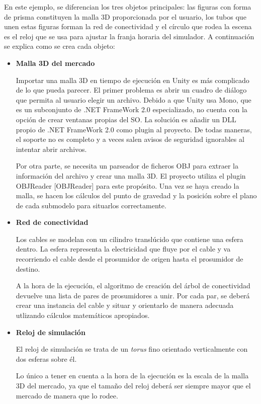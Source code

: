 \documentclass[12pt,a4paper,openright,oneside]{article}
\numberwithin{equation}{section}
\theoremstyle{definition}
\begin{document}
En este ejemplo, se diferencian los tres objetos principales: las figuras con forma de prisma constituyen la malla 3D proporcionada por el usuario, los tubos que unen estas figuras forman la red de conectividad y el círculo que rodea la escena es el reloj que se usa para ajustar la franja horaria del simulador. A continuación se explica como se crea cada objeto:
\begin{itemize}
\item \textbf{Malla 3D del mercado}

Importar una malla 3D en tiempo de ejecución en Unity es más complicado de lo que pueda parecer. El primer problema es abrir un cuadro de diálogo que permita al usuario elegir un archivo. Debido a que Unity usa Mono, que es un subconjunto de .NET FrameWork 2.0 especializado, no cuenta con la opción de crear ventanas propias del SO. La solución es añadir un DLL propio de .NET FrameWork 2.0 como plugin al proyecto. De todas maneras, el soporte no es completo y a veces salen avisos de seguridad ignorables al intentar abrir archivos.

Por otra parte, se necesita un parseador de ficheros OBJ para extraer la información del archivo y crear una malla 3D. El proyecto utiliza el plugin OBJReader [OBJReader] para este propósito. Una vez se haya creado la malla, se hacen los cálculos del punto de gravedad y la posición sobre el plano de cada submodelo para situarlos correctamente.

\item \textbf{Red de conectividad}

Los cables se modelan con un cilindro translúcido que contiene una esfera dentro. La esfera representa la electricidad que fluye por el cable y va recorriendo el cable desde el prosumidor de origen hasta el prosumidor de destino.

A la hora de la ejecución, el algoritmo de creación del árbol de conectividad devuelve una lista de pares de prosumidores a unir. Por cada par, se deberá crear una instancia del cable y situar y orientarlo de manera adecuada utlizando cálculos matemáticos apropiados.

\item \textbf{Reloj de simulación}

El reloj de simulación se trata de un \textit{torus} fino orientado verticalmente con dos esferas sobre él.

Lo único a tener en cuenta a la hora de la ejecución es la escala de la malla 3D del mercado, ya que el tamaño del reloj deberá ser siempre mayor que el mercado de manera que lo rodee.
\end{itemize}
\end{document}
